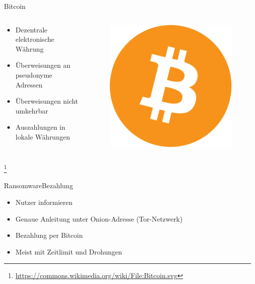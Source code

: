 \documentclass[10pt]{beamer}
\begin{document}
\begin{frame}{Bitcoin}
	\begin{columns}
		\begin{column}{7cm}		
			\begin{itemize}
				\item Dezentrale elektronische Währung
				\item Überweisungen an pseudonyme Adressen
				\item Überweisungen nicht umkehrbar
				\item Auszahlungen in lokale Währungen
			\end{itemize}
		\end{column}
		\begin{column}{4cm}
			\begin{figure}[p]
				\centering
				\includegraphics[scale=0.2]{bitcoin.png}
			\end{figure}
		\end{column}
	\end{columns}
	\let\thefootnote\relax\footnote{\url{https://commons.wikimedia.org/wiki/File:Bitcoin.svg}}
\end{frame}

	
	
	
\begin{frame}{Ransomware}{Bezahlung}
	\begin{itemize}
		\item Nutzer informieren
		\item Genaue Anleitung unter Onion-Adresse (Tor-Netzwerk)
		\item Bezahlung per Bitcoin
		\item Meist mit Zeitlimit und Drohungen
	\end{itemize}
\end{frame}
\end{document}
